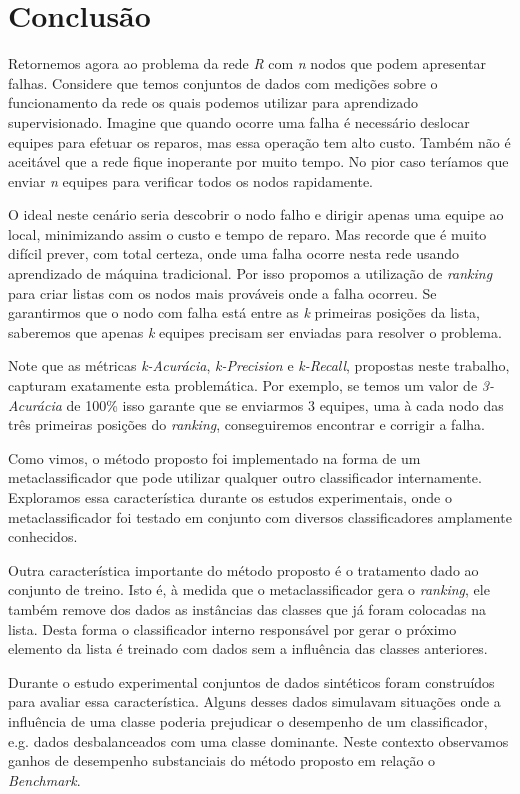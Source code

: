 \chapter{Conclusão}

Retornemos agora ao problema da rede \textit{R} com \textit{n} nodos que podem apresentar falhas.
Considere que temos conjuntos de dados com medições sobre o funcionamento da rede os quais podemos utilizar para aprendizado supervisionado.
Imagine que quando ocorre uma falha é necessário deslocar equipes para efetuar os reparos, mas essa operação tem alto custo.
Também não é aceitável que a rede fique inoperante por muito tempo.
No pior caso teríamos que enviar \textit{n} equipes para verificar todos os nodos rapidamente.

O ideal neste cenário seria descobrir o nodo falho e dirigir apenas uma equipe ao local, minimizando assim o custo e tempo de reparo.
Mas recorde que é muito difícil prever, com total certeza, onde uma falha ocorre nesta rede usando aprendizado de máquina tradicional.
Por isso propomos a utilização de \textit{ranking} para criar listas com os nodos mais prováveis onde a falha ocorreu.
Se garantirmos que o nodo com falha está entre as \textit{k} primeiras posições da lista, saberemos que apenas \textit{k} equipes precisam ser enviadas para resolver o problema.

Note que as métricas \textit{k-Acurácia}, \textit{k-Precision} e \textit{k-Recall}, propostas neste trabalho, capturam exatamente esta problemática.
Por exemplo, se temos um valor de \textit{3-Acurácia} de 100\% isso garante que se enviarmos 3 equipes, uma à cada  nodo das três primeiras posições do \textit{ranking}, conseguiremos encontrar e corrigir a falha.

Como vimos, o método proposto foi implementado na forma de um metaclassificador que pode utilizar qualquer outro classificador internamente.
Exploramos essa característica durante os estudos experimentais, onde o metaclassificador foi testado em conjunto com diversos classificadores amplamente conhecidos.

Outra característica importante do método proposto é o tratamento dado ao conjunto de treino.
Isto é, à medida que o metaclassificador gera o \textit{ranking}, ele também remove dos dados as instâncias das classes que já foram colocadas na lista.
Desta forma o classificador interno responsável por gerar o próximo elemento da lista é treinado com dados sem a influência das classes anteriores.

Durante o estudo experimental conjuntos de dados sintéticos foram construídos para avaliar essa característica.
Alguns desses dados simulavam situações onde a influência de uma classe poderia prejudicar o desempenho de um classificador, e.g. dados desbalanceados com uma classe dominante.
Neste contexto observamos ganhos de desempenho substanciais do método proposto em relação o \textit{Benchmark}.

